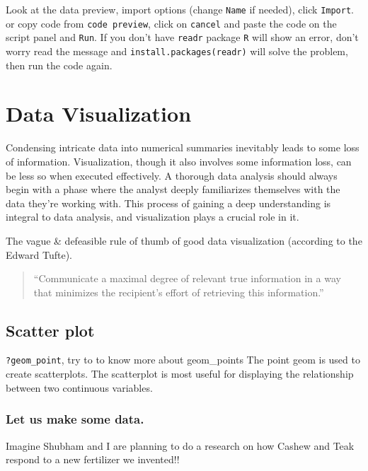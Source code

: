 \documentclass[
]{book}
\begin{document}
Look at the data preview, import options (change \texttt{Name} if needed), click \texttt{Import}. or copy code from \texttt{code\ preview}, click on \texttt{cancel} and paste the code on the script panel and \texttt{Run}. If you don't have \texttt{readr} package \texttt{R} will show an error, don't worry read the message and \texttt{install.packages(\textquotesingle{}readr\textquotesingle{})} will solve the problem, then run the code again.

\hypertarget{data-visualization}{%
\chapter{Data Visualization}\label{data-visualization}}

Condensing intricate data into numerical summaries inevitably leads to some loss of information. Visualization, though it also involves some information loss, can be less so when executed effectively. A thorough data analysis should always begin with a phase where the analyst deeply familiarizes themselves with the data they're working with. This process of gaining a deep understanding is integral to data analysis, and visualization plays a crucial role in it.

The vague \& defeasible rule of thumb of good data visualization (according to the Edward Tufte).

\begin{quote}
``Communicate a maximal degree of relevant true information in a way that minimizes the recipient's effort of retrieving this information.''
\end{quote}

\hypertarget{scatter-plot}{%
\section{Scatter plot}\label{scatter-plot}}

\texttt{?geom\_point}, try to to know more about geom\_points
The point geom is used to create scatterplots. The scatterplot is most useful for displaying the relationship between two continuous variables.

\hypertarget{let-us-make-some-data.}{%
\subsection{Let us make some data.}\label{let-us-make-some-data.}}

Imagine Shubham and I are planning to do a research on how Cashew and Teak respond to a new fertilizer we invented!!
\end{document}
